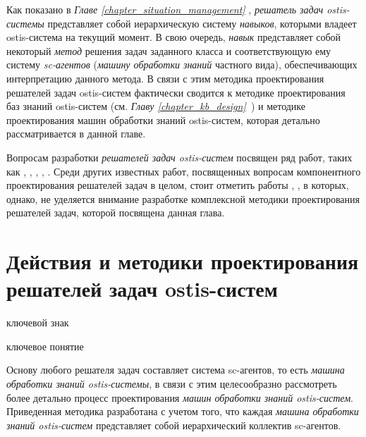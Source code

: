 Как показано в \textit{Главе \ref{chapter_situation_management} }, \textit{решатель задач ostis-системы} представляет собой иерархическую систему \textit{навыков}, которыми владеет ostis-система на текущий момент. В свою очередь, \textit{навык} представляет собой некоторый \textit{метод} решения задач заданного класса и соответствующую ему систему \textit{sc-агентов} (\textit{машину обработки знаний} частного вида), обеспечивающих интерпретацию данного метода. В связи с этим методика проектирования решателей задач ostis-систем фактически сводится к методике проектирования баз знаний ostis-систем (см. \textit{Главу \ref{chapter_kb_design}~}) и методике проектирования машин обработки знаний ostis-систем, которая детально рассматривается в данной главе.

Вопросам разработки \textit{решателей задач ostis-систем} посвящен ряд работ, таких как 
, , , , . Среди других известных работ, посвященных вопросам компонентного проектирования решателей задач в целом, стоит отметить работы , , в которых, однако, не уделяется внимание разработке комплексной методики проектирования решателей задач, которой посвящена данная глава.

\section{Действия и методики проектирования решателей задач ostis-систем}
\label{sec_ps_design_methodology}
\begin{SCn}
\bigskip

\begin{scnrelfromlist}{ключевой знак}
\end{scnrelfromlist}

\begin{scnrelfromlist}{ключевое понятие}
\end{scnrelfromlist}

\end{SCn}

Основу любого решателя задач составляет система sc-агентов, то есть \textit{машина обработки знаний ostis-системы}, в связи с этим целесообразно рассмотреть более детально процесс проектирования \textit{машин обработки знаний ostis-систем}. Приведенная методика разработана с учетом того, что каждая \textit{машина обработки знаний ostis-систем} представляет собой иерархический коллектив sc-агентов.

